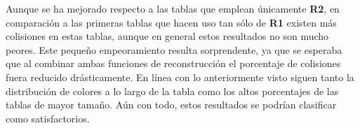 \documentclass[12pt,spanish,listoffigures,listoftables,listofalgorithms]{tfgetsinf}
\begin{document}
\def\arraystretch{1.5}
\begin{table}[H]
	\centering
	\caption{Porcentajes de colisiones para las tablas empleando la concatenación de las funciones de reconstrucción}
	\label{colR1R2}
\end{table}

Aunque se ha mejorado respecto a las tablas que emplean únicamente \textbf{R2}, en comparación a las primeras tablas que hacen uso tan sólo de \textbf{R1} existen más colisiones en estas tablas, aunque en general estos resultados no son mucho peores. Este pequeño empeoramiento resulta sorprendente, ya que se esperaba que al combinar ambas funciones de reconstrucción el porcentaje de colisiones fuera reducido drásticamente. En línea con lo anteriormente visto siguen tanto la distribución de colores a lo largo de la tabla como los altos porcentajes de las tablas de mayor tamaño. Aún con todo, estos resultados se podrían clasificar como satisfactorios.
\end{document}
